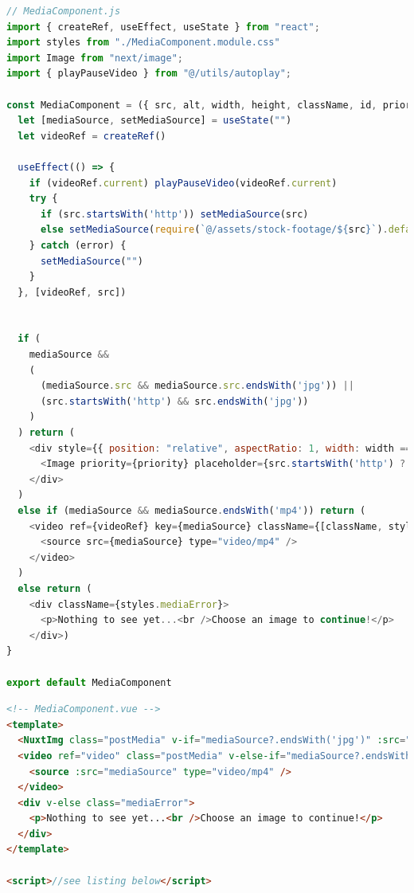 \documentclass[a4paper, 10pt]{article}
\begin{document}
\begin{lstlisting}[caption=MediaComponent in Next.js, label={lst:Next:MediaComponent}, language=JavaScript, escapechar=°]
// MediaComponent.js
import { createRef, useEffect, useState } from "react";
import styles from "./MediaComponent.module.css"
import Image from "next/image";
import { playPauseVideo } from "@/utils/autoplay";

const MediaComponent = ({ src, alt, width, height, className, id, priority = false }) => {
  let [mediaSource, setMediaSource] = useState("")
  let videoRef = createRef()

  useEffect(() => {
    if (videoRef.current) playPauseVideo(videoRef.current)
    try {
      if (src.startsWith('http')) setMediaSource(src)
      else setMediaSource(require(`@/assets/stock-footage/${src}`).default)°\label{line:Next:MediaComponent:imageImport}°
    } catch (error) {
      setMediaSource("")
    }
  }, [videoRef, src])


  if (
    mediaSource &&
    (
      (mediaSource.src && mediaSource.src.endsWith('jpg')) ||
      (src.startsWith('http') && src.endsWith('jpg'))
    )
  ) return (
    <div style={{ position: "relative", aspectRatio: 1, width: width == "100%" ? width : `${width}px`, overflow: "hidden" }} id={id} className={[className, styles.postMedia].join(" ")}>
      <Image priority={priority} placeholder={src.startsWith('http') ? "empty" : "blur"} quality={50} src={mediaSource} alt={alt} width={width.endsWith("%") ? 600 : width} height={height || (width.endsWith("%") ? 600 : width)} />
    </div>
  )
  else if (mediaSource && mediaSource.endsWith('mp4')) return (
    <video ref={videoRef} key={mediaSource} className={[className, styles.postMedia].join(" ")} id={id} width={width} preload="metadata" controls controlsList="nodownload,nofullscreen,noremoteplayback" disablePictureInPicture loop muted >
      <source src={mediaSource} type="video/mp4" />
    </video>
  )
  else return (
    <div className={styles.mediaError}>
      <p>Nothing to see yet...<br />Choose an image to continue!</p>
    </div>)
}

export default MediaComponent
\end{lstlisting}

\begin{lstlisting}[caption=MediaComponent in Nuxt (Template), label={lst:Nuxt:MediaComponent:Template}, language=HTML]
<!-- MediaComponent.vue -->
<template>
  <NuxtImg class="postMedia" v-if="mediaSource?.endsWith('jpg')" :src="mediaSource" :alt="alt" :preset="preset" :loading="priority ? 'eager' : 'lazy'" :preload="priority" :width="$config.public.image_presets[preset].modifiers.width" :height="$config.public.image_presets[preset].modifiers.height"/>
  <video ref="video" class="postMedia" v-else-if="mediaSource?.endsWith('mp4')" :width="width" preload="metadata" controls controlslist="nodownload,nofullscreen,noremoteplayback" disablepictureinpicture loop muted >
    <source :src="mediaSource" type="video/mp4" />
  </video>
  <div v-else class="mediaError">
    <p>Nothing to see yet...<br />Choose an image to continue!</p>
  </div>
</template>

<script>//see listing below</script>
\end{lstlisting}
\end{document}
